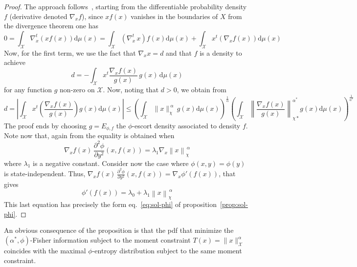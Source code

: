 \documentclass[english,sort&compress]{elsarticle}
\theoremstyle{definition}
\theoremstyle{plain}
\theoremstyle{plain}
\def\dmu{\mathrm{d}\mu}
\def\X{\mathcal{X}}
\begin{document}
\begin{proof}
  The   approach   follows~\cite{Ber13},   starting  from   the   differentiable
  probability  density $f$  (derivative denoted  $\nabla_x f$),  since  $x f(x)$
  vanishes in the boundaries of $X$ from the divergence theorem one has
  \[
  0  =  \int_\X  \nabla_x^t \left(  x  f(x)  \right)  \dmu(x) =  \int_\X  \left(
    \nabla_x^t  \, x \right)  f(x) \dmu(x)  + \int_\X  x^t \left(  \nabla_x f(x)
  \right) \dmu(x)
  \]
  Now, for the first term, we use the fact that $\nabla_x x = d$ and that $f$ is
  a density to achieve
  \[
  d = - \int_\X x^t \frac{\nabla_x f(x)}{g(x)} \, g(x) \, \dmu(x)
  \]
  for any function  $g$ non-zero on $\X$.   Now, noting that $d >  0$, we obtain
  from \cite[Lemma 2]{Ber13}
  \[
  d  =  \left| \int_\X x^t \left( \frac{\nabla_x f(x)}{g(x)} \right) g(x)
  \dmu(x) \right| \le  \left( \int_\X \|x\|_\chi^{\: \alpha} \, g(x) \dmu(x)
  \right)^{\frac{1}{\alpha}} \left( \int_\X \left\| \frac{\nabla_x
  f(x)}{g(x)}\right\|_{\chi*}^{\alpha^*} g(x) \dmu(x) \right)^{\frac{1}{\alpha^*}}
  \]
  The  proof  ends  by  choosing  $g =  E_{\phi,f}$  the  $\phi$-escort  density
  associated to density $f$. Note now that, again from \cite[Lemma~2]{Ber13} the
  equality is obtained when
  \[
  \nabla_x  f(x) \,  \frac{\partial^2 \phi}{\partial  y^2} (x,f(x))  = \lambda_1
  \nabla_x \left\| x \right\|_\chi^{\, \alpha}
  \]
  where  $\lambda_1$  is a  negative  constant.   Consider  now the  case  where
  $\phi(x,y)  =   \phi(y)$  is   state-independent.  Thus,  $\nabla_x   f(x)  \,
  \frac{\partial^2  \phi}{\partial y^2} (x,f(x))  = \nabla_x  \phi'(f(x))$, that
  gives
  \[
  \phi'(f(x)) = \lambda_0 + \lambda_1 \left\| x \right\|_\chi^{\, \alpha}
  \]
  This  last   equation  has   precisely  the  form   eq.~\eqref{eq:sol-phi}  of
  proposition~\ref{prop:sol-phi}.
\end{proof}
%
An obvious  consequence of  the proposition  is that the  pdf that  minimize the
$(\alpha^*,\phi)$-Fisher information  subject to  the moment constraint  $T(x) =
\|x\|_\X^\alpha$ coincides with  the maximal $\phi$-entropy distribution subject
to the same moment constraint.
\end{document}
